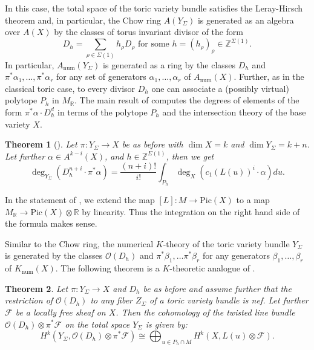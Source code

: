 \documentclass[oneside]{amsart}
\theoremstyle{plain}
\newtheorem{theorem}{Theorem}[section]
\theoremstyle{definition}
\newcommand{\R}{{\mathbb{R}}}
\newcommand{\Z}{{\mathbb{Z}}}
\newcommand{\Om}{{\mathcal{O}}}
\newcommand{\Pic}{{\mathrm{Pic}}}
\begin{document}
In this case, the total space of the toric variety bundle satisfies the Leray-Hirsch theorem and, in particular, the Chow ring $A(Y_\Sigma)$ is generated as an algebra over $A(X)$ by the classes of torus invariant divisor of the form
\[
D_{ h}=\sum_{\rho\in \Sigma(1)} h_\rho D_\rho \text{ for some } h = (h_\rho)_\rho \in \Z^{\Sigma(1)}. 
\]
In particular, $A_\mathrm{num}(Y_\Sigma)$ is generated as a ring by the classes $D_h$ and $\pi^*\alpha_1,\ldots, \pi^*\alpha_r$ for any set of generators $\alpha_1,\ldots, \alpha_r$ of $A_\mathrm{num}(X)$.
Further, as in the classical toric case, to every divisor $D_h$ one can associate a (possibly virtual) polytope $P_h$ in $M_\R$. The main result of
\cite{hof2020} computes the degrees of elements of the form $\pi^*\alpha \cdot D_h^d$ in terms of the polytope $P_h$ and the intersection theory of the base variety $X$.
\begin{theorem}[{\cite[Theorem 4.1]{hof2020}}]\label{thm:bundleBKK}
    Let $\pi\colon Y_\Sigma \to X$ be as before with $\dim X = k$ and $\dim Y_\Sigma = k+n$. Let further $\alpha\in A^{k-i}(X)$, and $h \in \Z^{\Sigma(1)}$, then we get
    \[
    \deg_{Y_\Sigma} (D_h^{n+i}\cdot \pi^*\alpha) = \frac{(n+i)!}{i!}\int_{P_h} \deg_X(c_1(L(u))^i\cdot \alpha) du.
    \]
\end{theorem}
In the statement of , we extend the map $[L]\colon M\to \Pic(X)$ to a map $M_\R\to \Pic(X)\otimes \R$ by linearity. Thus the integration on the right hand side of the formula makes sense.


Similar to the Chow ring, the numerical $K$-theory of the toric variety bundle $Y_\Sigma$ is generated by the classes  $\Om(D_h)$  and  $\pi^*\beta_1,\ldots \pi^*\beta_r$ for any generators $\beta_1,\ldots,\beta_r$ of $K_\mathrm{num}(X)$. The following theorem is a $K$-theoretic analogue of .

\begin{theorem}\label{thm:coh}
Let $\pi\colon Y_\Sigma \to X$ and $D_h$ be as before and assume further that  the restriction of $\Om(D_h)$ to any fiber $Z_\Sigma$ of a toric variety bundle is nef. Let further $\mathcal{F}$ be a locally free sheaf on $X$.
Then the cohomology of the twisted line bundle $\Om(D_h) \otimes \pi^* \mathcal{F}$ 
on the total space $Y_\Sigma$ is given by:
\[
H^k(Y_\Sigma, \Om(D_h) \otimes \pi^* \mathcal{F}) \cong \bigoplus_{u \in P_h \cap M} H^k(X, L(u)\otimes \mathcal{F}).
\]
\end{theorem}
\end{document}
